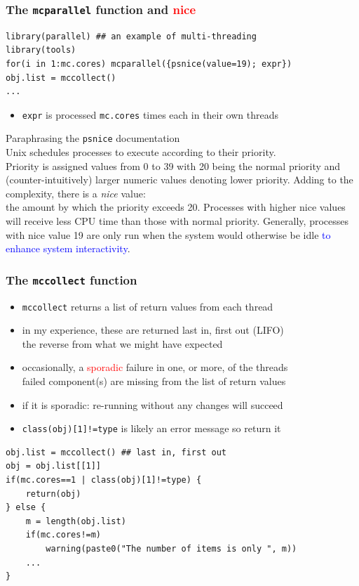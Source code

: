 \documentclass[11pt,pdftex,dvipsnames,usenames,helvetica]{beamer}
\begin{document}
\begin{frame}[fragile]
\frametitle{The {\tt mcparallel} function and \textcolor{red}{nice}}
\begin{verbatim}
library(parallel) ## an example of multi-threading
library(tools)
for(i in 1:mc.cores) mcparallel({psnice(value=19); expr})
obj.list = mccollect() 
...
\end{verbatim}
\begin{itemize}
\item {\tt expr} is processed {\tt mc.cores} times
  each in their own threads
\end{itemize}
Paraphrasing the {\tt psnice} documentation\\
Unix schedules processes to execute according to their priority.\\  Priority
is assigned values from 0 to 39 with 20 being the normal priority and
(counter-intuitively) larger numeric values denoting lower priority.
Adding to the complexity, there is a {\it nice} value:\\ the amount by
which the priority exceeds 20.  Processes with higher nice values will
receive less CPU time than those with normal priority.  Generally,
processes with nice value 19 are only run when the system would
otherwise be idle \textcolor{blue}{to enhance system interactivity}.
\end{frame}

\begin{frame}[fragile] 
\frametitle{The {\tt mccollect} function}
\begin{itemize}
\item {\tt mccollect} returns a list of return values from each thread
\item in my experience, these are returned last in, first out (LIFO)\\ 
the reverse from what we might have expected
\item occasionally, a \textcolor{red}{sporadic} failure in one, or
  more, of the threads\\
failed component(s) are missing from the list of return values
\item if it is sporadic: re-running without any changes will succeed
\item {\tt class(obj)[1]!=type} is likely an error message so return it
\end{itemize}
\begin{verbatim}
obj.list = mccollect() ## last in, first out
obj = obj.list[[1]]
if(mc.cores==1 | class(obj)[1]!=type) {
    return(obj)
} else {
    m = length(obj.list)
    if(mc.cores!=m) 
        warning(paste0("The number of items is only ", m))
    ...
}
\end{verbatim}
\end{frame}
\end{document}
